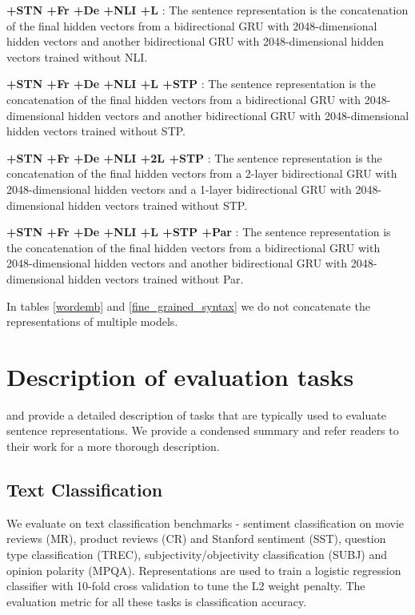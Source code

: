 \documentclass{article} \usepackage{iclr2018_conference,times}
\begin{document}
\textbf{+STN +Fr +De +NLI +L} : The sentence representation  is the concatenation of the final hidden vectors from a bidirectional GRU with 2048-dimensional hidden vectors and another bidirectional GRU with 2048-dimensional hidden vectors trained without NLI.

\textbf{+STN +Fr +De +NLI +L +STP} : The sentence representation  is the concatenation of the final hidden vectors from a bidirectional GRU with 2048-dimensional hidden vectors and another bidirectional GRU with 2048-dimensional hidden vectors trained without STP.

\textbf{+STN +Fr +De +NLI +2L +STP} : The sentence representation  is the concatenation of the final hidden vectors from a 2-layer bidirectional GRU with 2048-dimensional hidden vectors and a 1-layer bidirectional GRU with 2048-dimensional hidden vectors trained without STP.

\textbf{+STN +Fr +De +NLI +L +STP +Par} : The sentence representation  is the concatenation of the final hidden vectors from a bidirectional GRU with 2048-dimensional hidden vectors and another bidirectional GRU with 2048-dimensional hidden vectors trained without Par.

In tables \ref{wordemb} and \ref{fine_grained_syntax} we do not concatenate the representations of multiple models.

\section{Description of evaluation tasks}
\label{label:evaluation_tasks}
\cite{kiros2015skip} and \cite{conneau2017supervised} provide a detailed description of tasks that are typically used to evaluate sentence representations. We provide a condensed summary and refer readers to their work for a more thorough description.

\subsection{Text Classification} We evaluate on text classification benchmarks - sentiment classification on movie reviews (MR), product reviews (CR) and Stanford sentiment (SST), question type classification (TREC), subjectivity/objectivity classification (SUBJ) and opinion polarity (MPQA). Representations are used to train a logistic regression classifier with 10-fold cross validation to tune the L2 weight penalty. The evaluation metric for all these tasks is classification accuracy.
\end{document}
